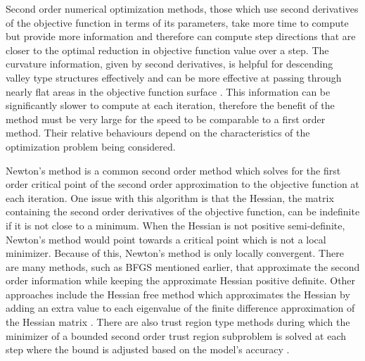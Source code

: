 \documentclass[letterpaper,12pt,titlepage,oneside,final]{book}
\begin{document}
	Second order numerical optimization methods, those which use second derivatives of the objective function in terms of its parameters, take more time to compute but provide more information and therefore can compute step directions that are closer to the optimal reduction in objective function value over a step. The curvature information, given by second derivatives, is helpful for descending valley type structures effectively and can be more effective at passing through nearly flat areas in the objective function surface \cite{Shepherd.1997}. This information can be significantly slower to compute at each iteration, therefore the benefit of the method must be very large for the speed to be comparable to a first order method. Their relative behaviours depend on the characteristics of the optimization problem being considered. 
	
	Newton's method is a common second order method which solves for the first order critical point of the second order approximation to the objective function at each iteration. One issue with this algorithm is that the Hessian, the matrix containing the second order derivatives of the objective function, can be indefinite if it is not close to a minimum. When the Hessian is not positive semi-definite, Newton's method would point towards a critical point which is not a local minimizer. Because of this, Newton's method is only locally convergent. There are many methods, such as BFGS mentioned earlier, that approximate the second order information while keeping the approximate Hessian positive definite. Other approaches include the Hessian free method which approximates the Hessian by adding an extra value to each eigenvalue of the finite difference approximation of the Hessian matrix \cite{martens2010deep}. There are also trust region type methods during which the minimizer of a bounded second order trust region subproblem is solved at each step where the bound is adjusted based on the model's accuracy \cite{wright1999numerical}. 
	
\end{document}

